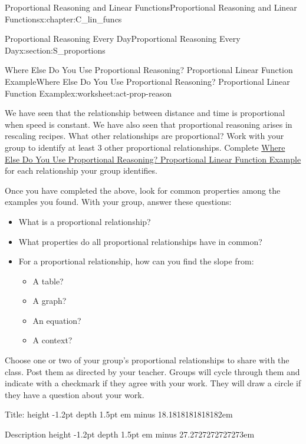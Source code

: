 \documentclass[oneside,10pt,]{book}
\newcommand{\fillin}[1]{\leavevmode\leaders\vrule height -1.2pt depth 1.5pt \hskip #1em minus #1em \null}
\numberwithin{equation}{chapter}
\begin{document}
\begin{chapterptx}{Proportional Reasoning and Linear Functions}{}{Proportional Reasoning and Linear Functions}{}{}{x:chapter:C_lin_funcs}
\begin{sectionptx}{Proportional Reasoning Every Day}{}{Proportional Reasoning Every Day}{}{}{x:section:S_proportions}
\restoregeometry
%
%
\typeout{************************************************}
\typeout{************************************************}
%
\begin{worksheet-subsection}{Where Else Do You Use Proportional Reasoning? Proportional Linear Function Example}{}{Where Else Do You Use Proportional Reasoning? Proportional Linear Function Example}{}{}{x:worksheet:act-prop-reason}
\begin{introduction}{}%
We have seen that the relationship between distance and time is proportional when speed is constant. We have also seen that proportional reasoning arises in rescaling recipes. What other relationships are proportional? Work with your group to identify at least 3 other proportional relationships. Complete \hyperref[x:worksheet:act-prop-reason]{Where Else Do You Use Proportional Reasoning? Proportional Linear Function Example} for each relationship your group identifies.%
\par
Once you have completed the above, look for common properties among the examples you found. With your group, answer these questions:%
\begin{itemize}[label=\textbullet]
\item{}What is a proportional relationship?%
\item{}What properties do all proportional relationships have in common?%
\item{}For a proportional relationship, how can you find the slope from:%
\begin{itemize}[label=$\circ$]
\item{}A table?%
\item{}A graph?%
\item{}An equation?%
\item{}A context?%
\end{itemize}
%
\end{itemize}
%
\par
Choose one or two of your group's proportional relationships to share with the class. Post them as directed by your teacher. Groups will cycle through them and indicate with a checkmark if they agree with your work. They will draw a circle if they have a question about your work.%
\end{introduction}%
Title: \fillin{18.1818181818182}%
\par
Description \fillin{27.2727272727273}%

\end{worksheet-subsection}
\end{sectionptx}
\end{chapterptx}
\end{document}
